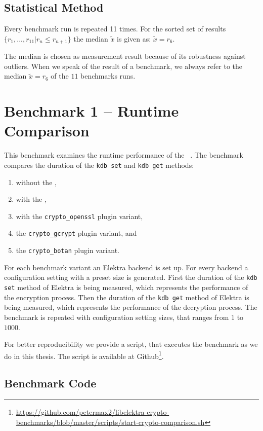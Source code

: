   \subsection{Statistical Method}

Every benchmark run is repeated 11 times.
For the sorted set of results $\{r_{1},...,r_{11} | r_n \leq r_{n+1}\}$ the median $\tilde{x}$ is given as: $\tilde{x}=r_6$.

The median is chosen as measurement result because of its robustness against outliers.
When we speak of the result of a benchmark, we always refer to the median $\tilde{x}=r_6$ of the $11$ benchmarks runs.

\section{Benchmark 1 -- Runtime Comparison}
\label{eval-bench-one}

This benchmark examines the runtime performance of the \crypto ~.
The benchmark compares the duration of the \texttt{kdb set} and \texttt{kdb get} methods:

\begin{enumerate}
\item without the \crypto ,
\item with the \fcrypt ,
\item with the \texttt{crypto\_openssl} plugin variant,
\item the \texttt{crypto\_gcrypt} plugin variant, and 
\item the \texttt{crypto\_botan} plugin variant.
\end{enumerate}

For each benchmark variant an Elektra backend is set up.
For every backend a configuration setting with a preset size is generated.
First the duration of the \texttt{kdb set} method of Elektra is being measured, which represents the performance of the encryption process.
Then the duration of the \texttt{kdb get} method of Elektra is being measured, which represents the performance of the decryption process.
The benchmark is repeated with configuration setting sizes, that ranges from $1$ to $1000$.

For better reproducibility we provide a script, that executes the benchmark as we do in this thesis.
The script is available at Github\footnote{\url{https://github.com/petermax2/libelektra-crypto-benchmarks/blob/master/scripts/start-crypto-comparison.sh}}.

  \subsection{Benchmark Code}

